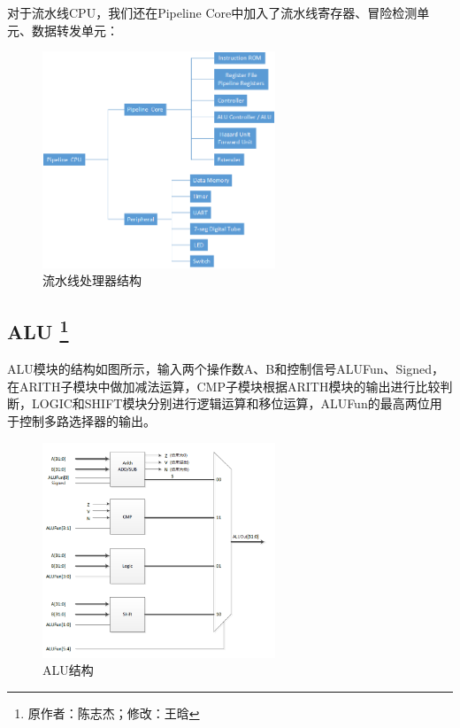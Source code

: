 \documentclass{article}
\begin{document}
            对于流水线CPU，我们还在Pipeline Core中加入了流水线寄存器、冒险检测单元、数据转发单元：
            \begin{figure}[H]
                    \centering
                    \includegraphics[width=0.62\textwidth]{images/pipeline.png}
                    \caption{\label{fig:pipeline}流水线处理器结构}
                \end{figure}

        \subsection{ALU \protect\footnote{原作者：陈志杰；修改：王晗}}
            ALU模块的结构如图所示，输入两个操作数A、B和控制信号ALUFun、Signed，在ARITH子模块中做加减法运算，CMP子模块根据ARITH模块的输出进行比较判断，LOGIC和SHIFT模块分别进行逻辑运算和移位运算，ALUFun的最高两位用于控制多路选择器的输出。
            \begin{figure}[H]
                    \centering
                    \includegraphics[width=0.62\textwidth]{images/ALU.png}
                    \caption{\label{fig:ALU}ALU结构}
                \end{figure}
\end{document}

